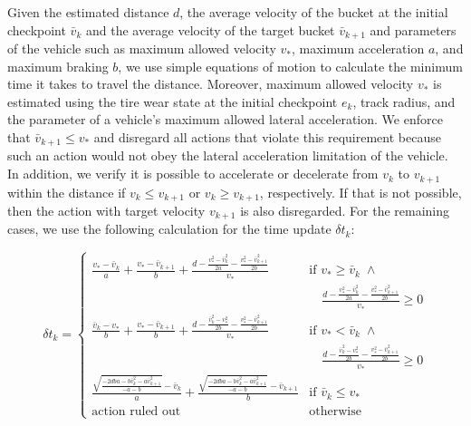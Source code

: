 Given the estimated distance $d$, the average velocity of the bucket at the initial checkpoint $\bar{v}_k$ and the average velocity of the target bucket $\bar{v}_{k+1}$ and parameters of the vehicle such as maximum allowed velocity $v_*$, maximum acceleration $a$, and maximum braking $b$, we use simple equations of motion to calculate the minimum time it takes to travel the distance.  Moreover, maximum allowed velocity $v_*$ is estimated using the tire wear state at the initial checkpoint $e_k$, track radius, and the parameter of a vehicle's maximum allowed lateral acceleration. We enforce that $\bar{v}_{k+1} \leq v_*$ and disregard all actions that violate this requirement because such an action would not obey the lateral acceleration limitation of the vehicle. In addition, we verify it is possible to accelerate or decelerate from $v_k$ to $v_{k+1}$ within the distance if $v_k \leq v_{k+1}$ or $v_k \geq v_{k+1}$, respectively. If that is not possible, then the action with target velocity $v_{k+1}$ is also disregarded. For the remaining cases, we use the following calculation for the time update $\delta t_k$:

\begin{equation} \label{eq:time_update}
    \delta t_{k} = \begin{cases}
    \frac{v_*-\bar{v}_k}{a} + \frac{v_*-\bar{v}_{k+1}}{b} + \frac{d-\frac{v_*^2-\bar{v}_k^2}{2a} - \frac{v_*^2-\bar{v}_{k+1}^2}{2b}}{v_*} 
    &  \text{if } v_* \geq \bar{v}_k \; \wedge \\
     &\quad \frac{d-\frac{v_*^2-\bar{v}_k^2}{2a} - \frac{v_*^2-\bar{v}_{k+1}^2}{2b}}{v_*} \geq 0 \\
    \frac{\bar{v}_k -v_*}{b} + \frac{v_*-\bar{v}_{k+1}}{b} + \frac{d-\frac{\bar{v}_k^2 -v_*^2}{2b} - \frac{v_*^2-\bar{v}_{k+1}^2}{2b}}{v_*} 
    &  \text{if } v_* < \bar{v}_k \;\wedge \\
    &\quad \frac{d-\frac{\bar{v}_k^2 -v_*^2}{2b} - \frac{v_*^2-\bar{v}_{k+1}^2}{2b}}{v_*} \geq 0 \\
    \frac{\sqrt{\frac{-2dba -b\bar{v}_k^2 -a\bar{v}_{k+1}^2}{-a-b}}-\bar{v}_{k}}{a} + \frac{\sqrt{\frac{-2dba -b\bar{v}_k^2 -a\bar{v}_{k+1}^2}{-a-b}}-\bar{v}_{k+1}}{b}
    & \text{if } \bar{v}_k \leq v_* \\
    \text{action ruled out}
    & \text{otherwise}
    \end{cases}
\end{equation}

